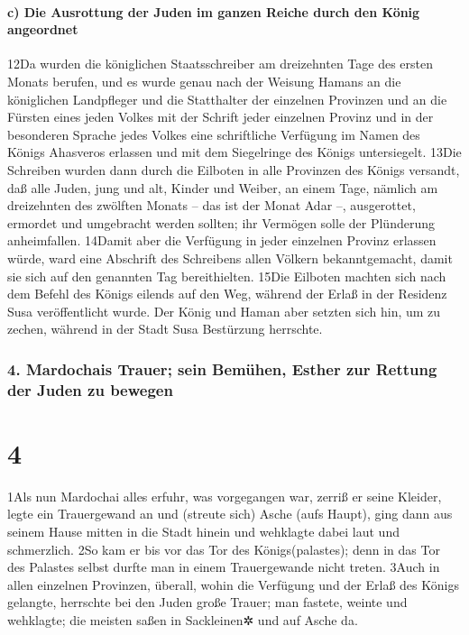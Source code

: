 \hypertarget{c-die-ausrottung-der-juden-im-ganzen-reiche-durch-den-kuxf6nig-angeordnet}{%
\paragraph{c) Die Ausrottung der Juden im ganzen Reiche durch den König
angeordnet}\label{c-die-ausrottung-der-juden-im-ganzen-reiche-durch-den-kuxf6nig-angeordnet}}

12Da wurden die königlichen Staatsschreiber am dreizehnten Tage des
ersten Monats berufen, und es wurde genau nach der Weisung Hamans an die
königlichen Landpfleger und die Statthalter der einzelnen Provinzen und
an die Fürsten eines jeden Volkes mit der Schrift jeder einzelnen
Provinz und in der besonderen Sprache jedes Volkes eine schriftliche
Verfügung im Namen des Königs Ahasveros erlassen und mit dem Siegelringe
des Königs untersiegelt. 13Die Schreiben wurden dann durch die Eilboten
in alle Provinzen des Königs versandt, daß alle Juden, jung und alt,
Kinder und Weiber, an einem Tage, nämlich am dreizehnten des zwölften
Monats -- das ist der Monat Adar --, ausgerottet, ermordet und
umgebracht werden sollten; ihr Vermögen solle der Plünderung
anheimfallen. 14Damit aber die Verfügung in jeder einzelnen Provinz
erlassen würde, ward eine Abschrift des Schreibens allen Völkern
bekanntgemacht, damit sie sich auf den genannten Tag bereithielten.
15Die Eilboten machten sich nach dem Befehl des Königs eilends auf den
Weg, während der Erlaß in der Residenz Susa veröffentlicht wurde. Der
König und Haman aber setzten sich hin, um zu zechen, während in der
Stadt Susa Bestürzung herrschte.

\hypertarget{mardochais-trauer-sein-bemuxfchen-esther-zur-rettung-der-juden-zu-bewegen}{%
\subsubsection{4. Mardochais Trauer; sein Bemühen, Esther zur Rettung
der Juden zu
bewegen}\label{mardochais-trauer-sein-bemuxfchen-esther-zur-rettung-der-juden-zu-bewegen}}

\hypertarget{section-3}{%
\section{4}\label{section-3}}

1Als nun Mardochai alles erfuhr, was vorgegangen war, zerriß er seine
Kleider, legte ein Trauergewand an und (streute sich) Asche (aufs
Haupt), ging dann aus seinem Hause mitten in die Stadt hinein und
wehklagte dabei laut und schmerzlich. 2So kam er bis vor das Tor des
Königs(palastes); denn in das Tor des Palastes selbst durfte man in
einem Trauergewande nicht treten. 3Auch in allen einzelnen Provinzen,
überall, wohin die Verfügung und der Erlaß des Königs gelangte,
herrschte bei den Juden große Trauer; man fastete, weinte und wehklagte;
die meisten saßen in Sackleinen✲ und auf Asche da.

